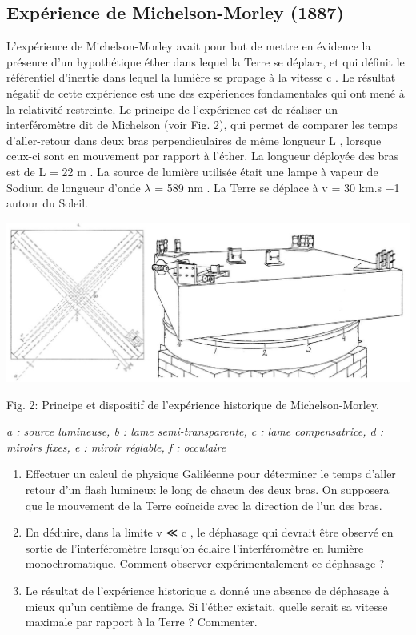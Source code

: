 \subsection{Expérience de Michelson-Morley (1887)}

L'expérience de Michelson-Morley avait pour but de mettre en évidence la présence d'un hypothétique
éther dans lequel la Terre se déplace, et qui définit le référentiel d'inertie dans lequel la
lumière se propage à la vitesse c . Le résultat négatif de cette expérience est une des expériences
fondamentales qui ont mené à la relativité restreinte.
Le principe de l'expérience est de réaliser un interféromètre dit de Michelson (voir Fig. 2), qui
permet de comparer les temps d'aller-retour dans deux bras perpendiculaires de même longueur
L , lorsque ceux-ci sont en mouvement par rapport à l'éther. La longueur déployée des bras est de
L = 22 m . La source de lumière utilisée était une lampe à vapeur de Sodium de longueur d'onde
$\lambda$ = 589 nm . La Terre se déplace à v = 30 km.s −1 autour du Soleil.

\begin{center}
\includegraphics[scale=0.5]{./presentation/cropped-Michelson-morley-header}

Fig. 2: Principe et dispositif de l'expérience historique de Michelson-Morley.

{\it a : source lumineuse, b : lame semi-transparente, c : lame compensatrice, d : miroirs fixes, e : miroir réglable, f : occulaire}
\end{center}
\begin{enumerate}
  \item Effectuer un calcul de physique Galiléenne pour déterminer le temps d'aller retour d'un
flash lumineux le long de chacun des deux bras. On supposera que le mouvement de la
Terre coïncide avec la direction de l'un des bras.
  \item En déduire, dans la limite v ≪ c , le déphasage qui devrait être observé en sortie de l'interféromètre lorsqu'on éclaire l'interféromètre en lumière monochromatique. Comment observer
expérimentalement ce déphasage ?
  \item Le résultat de l'expérience historique a donné une absence de déphasage à mieux qu'un
centième de frange. Si l'éther existait, quelle serait sa vitesse maximale par rapport à la
Terre ? Commenter.
\end{enumerate}
